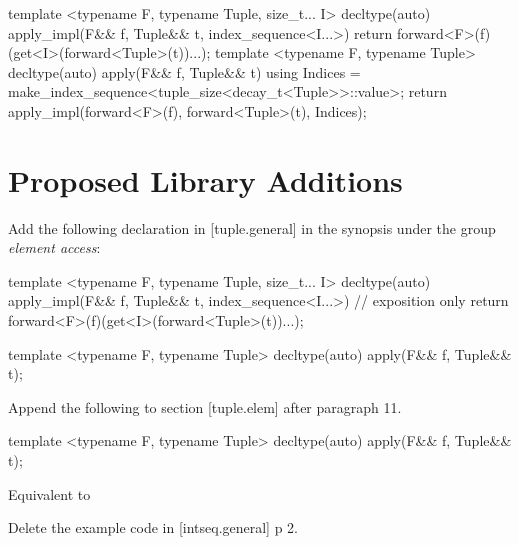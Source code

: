 \documentclass[ebook,11pt,article]{memoir}
\begin{document}
\begin{codeblock}
template <typename F, typename Tuple, size_t... I>
decltype(auto) apply_impl(F&& f, Tuple&& t, index_sequence<I...>) {
	return forward<F>(f)(get<I>(forward<Tuple>(t))...);
}
template <typename F, typename Tuple>
decltype(auto) apply(F&& f, Tuple&& t) {
  using Indices = make_index_sequence<tuple_size<decay_t<Tuple>>::value>;
  return apply_impl(forward<F>(f), forward<Tuple>(t), Indices{});
}
\end{codeblock}

\chapter{Proposed Library Additions}

Add the following declaration in [tuple.general] in the synopsis under the group \emph{element access}:

\begin{codeblock}
template <typename F, typename Tuple, size_t... I>
decltype(auto) 
apply_impl(F&& f, Tuple&& t, index_sequence<I...>) // exposition only
{
	return forward<F>(f)(get<I>(forward<Tuple>(t))...); 
}

template <typename F, typename Tuple>
decltype(auto) apply(F&& f, Tuple&& t);
\end{codeblock}


Append the following to section [tuple.elem] after paragraph 11.

\begin{itemdecl}
template <typename F, typename Tuple>
decltype(auto) apply(F&& f, Tuple&& t);
\end{itemdecl}
\begin{itemdescr}

\pnum
\effects Equivalent to 
\end{itemdescr}

Delete the example code in [intseq.general] p 2.






\end{document}
